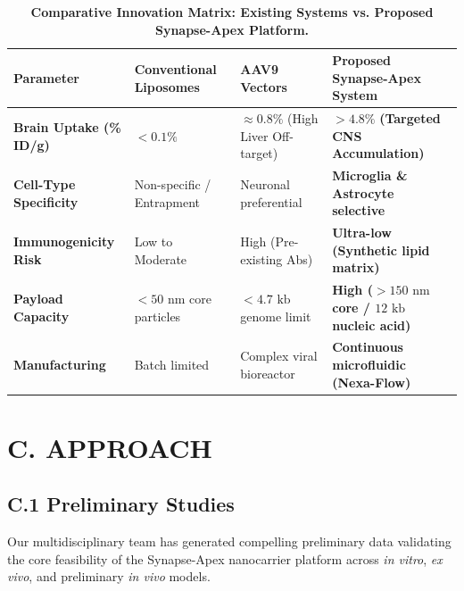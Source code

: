 \documentclass[11pt,letterpaper]{article}
\begin{document}
\begin{table}[h!]
\centering
\caption{\textbf{Comparative Innovation Matrix: Existing Systems vs. Proposed Synapse-Apex Platform.}}
\label{tab:innovation_matrix}
\small
{}
\begin{tabularx}{\textwidth}{@{}l X X X@{}}
\toprule
\rowcolor{NIHBlue} \color{white}\textbf{Parameter} & \color{white}\textbf{Conventional Liposomes} & \color{white}\textbf{AAV9 Vectors} & \color{white}\textbf{Proposed Synapse-Apex System} \\
\midrule
\textbf{Brain Uptake (\% ID/g)} & $< 0.1\%$ & $\approx 0.8\%$ (High Liver Off-target) & $\mathbf{> 4.8\%}$ \textbf{(Targeted CNS Accumulation)} \\
\textbf{Cell-Type Specificity} & Non-specific / Entrapment & Neuronal preferential & \textbf{Microglia \& Astrocyte selective} \\
\textbf{Immunogenicity Risk} & Low to Moderate & High (Pre-existing Abs) & \textbf{Ultra-low (Synthetic lipid matrix)} \\
\textbf{Payload Capacity} & $< 50\text{ nm}$ core particles & $< 4.7\text{ kb}$ genome limit & \textbf{High ($> 150\text{ nm}$ core / $12\text{ kb}$ nucleic acid)} \\
\textbf{Manufacturing} & Batch limited & Complex viral bioreactor & \textbf{Continuous microfluidic (Nexa-Flow)} \\
\bottomrule
\end{tabularx}
\end{table}

\vspace{-6pt}

\section{C. APPROACH}

\subsection{C.1 Preliminary Studies}
Our multidisciplinary team has generated compelling preliminary data validating the core feasibility of the Synapse-Apex nanocarrier platform across \textit{in vitro}, \textit{ex vivo}, and preliminary \textit{in vivo} models.
\end{document}
